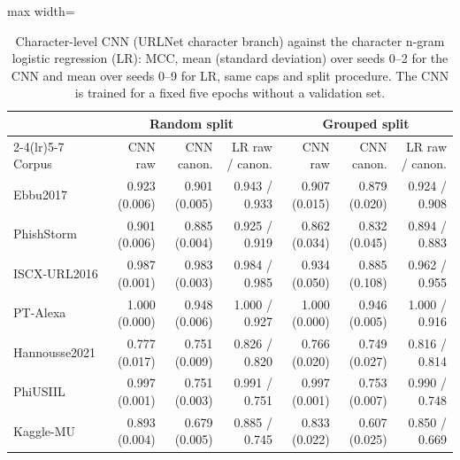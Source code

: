\begin{table}[tp]
\centering
\caption{Character-level CNN (URLNet character branch) against the character n-gram logistic regression (LR): MCC, mean (standard deviation) over seeds 0--2 for the CNN and mean over seeds 0--9 for LR, same caps and split procedure. The CNN is trained for a fixed five epochs without a validation set.}
\label{tab:cnn}
\footnotesize
\begin{adjustbox}{max width=\linewidth}
\begin{tabular}{@{}lrrrrrr@{}}
\toprule
 & \multicolumn{3}{c}{Random split} & \multicolumn{3}{c}{Grouped split} \\
\cmidrule(lr){2-4}\cmidrule(lr){5-7}
Corpus & CNN raw & CNN canon. & LR raw / canon. & CNN raw & CNN canon. & LR raw / canon. \\
\midrule
Ebbu2017 & 0.923 (0.006) & 0.901 (0.005) & 0.943 / 0.933 & 0.907 (0.015) & 0.879 (0.020) & 0.924 / 0.908 \\
PhishStorm & 0.901 (0.006) & 0.885 (0.004) & 0.925 / 0.919 & 0.862 (0.034) & 0.832 (0.045) & 0.894 / 0.883 \\
ISCX-URL2016 & 0.987 (0.001) & 0.983 (0.003) & 0.984 / 0.985 & 0.934 (0.050) & 0.885 (0.108) & 0.962 / 0.955 \\
PT-Alexa & 1.000 (0.000) & 0.948 (0.006) & 1.000 / 0.927 & 1.000 (0.000) & 0.946 (0.005) & 1.000 / 0.916 \\
Hannousse2021 & 0.777 (0.017) & 0.751 (0.009) & 0.826 / 0.820 & 0.766 (0.020) & 0.749 (0.027) & 0.816 / 0.814 \\
PhiUSIIL & 0.997 (0.001) & 0.751 (0.003) & 0.991 / 0.751 & 0.997 (0.001) & 0.753 (0.007) & 0.990 / 0.748 \\
Kaggle-MU & 0.893 (0.004) & 0.679 (0.005) & 0.885 / 0.745 & 0.833 (0.022) & 0.607 (0.025) & 0.850 / 0.669 \\
\bottomrule
\end{tabular}
\end{adjustbox}
\end{table}
